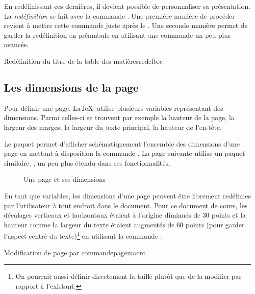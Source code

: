 En redéfinissant ces dernières, il devient possible de personnaliser sa présentation. La \emph{redéfinition} se fait avec la commande . Une première manière de procéder revient à mettre cette commande juste après le . Une seconde manière permet de garder la redéfinition en préambule en utilisant une commande un peu plus avancée.

\begin{codesimple}{Redéfinition du titre de la table des matières}{redeftoc}
\addto\captionsfrench{\renewcommand{\contentsname}{Sommaire}}   %

\renewcommand{\contentsname}{Sommaire}   %
\end{codesimple}


\subsection{Les dimensions de la page}  \label{page}

Pour définir une page, \LaTeX\ utilise plusieurs variables représentant des dimensions. Parmi celles-ci se trouvent par exemple la hauteur de la page, la largeur des marges, la largeur du texte principal, la hauteur de l'en-tête. 

Le paquet  permet d'afficher schématiquement l'ensemble des dimensions d'une page en mettant à disposition la commande . La page suivante utilise un paquet similaire, , un peu plus étendu dans ses fonctionnalités.

\begin{figure}[!t]
\centering
\currentpage
\drawpage
\pagevalues
\caption{Une page et ses dimensions}
\end{figure}
\newpage

En tant que variables, les dimensions d'une page peuvent être librement redéfinies par l'utilisateur à tout endroit dans le document. Pour ce document de cours, les décalages verticaux et horizontaux étaient à l'origine diminués de 30 points et la hauteur comme la largeur du texte étaient augmentés de 60 points (pour garder l'aspect centré du texte)\footnote{On pourrait aussi définir directement la taille plutôt que de la modifier par rapport à l'existant.} en utilisant la  commande  :

\begin{codesimple}{Modification de page par commande}{pagemacro}
\addtolength{\hoffset}{-30pt}
\addtolength{\textwidth}{60pt} 
\addtolength{\voffset}{-30pt} 
\addtolength{\textheight}{60pt}
\end{codesimple}


